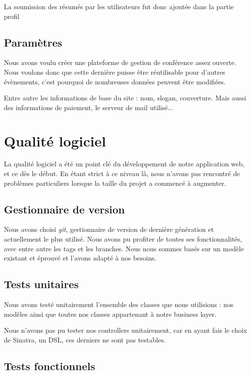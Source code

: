 \documentclass[a4paper,11pt]{article}
\begin{document}
La soumission des résumés par les utilisateurs fut donc ajoutée dans la partie profil


\subsection{Paramètres}

Nous avons voulu créer une plateforme de gestion de conférence assez ouverte. Nous voulons donc que cette dernière puisse être réutilisable pour d'autres évènements, c'est pourquoi de nombreuses données peuvent être modifiées.

Entre autre les informations de base du site : nom, slogan, couverture. Mais aussi des informations de paiement, le serveur de mail utilisé...

\section{Qualité logiciel}

La qualité logiciel a été un point clé du développement de notre application web, et ce dès le début. En étant strict à ce niveau là, nous n'avons pas rencontré de problèmes particuliers lorsque la taille du projet a commencé à augmenter.

\subsection{Gestionnaire de version}

Nous avons choisi \textit{git}, gestionnaire de version de dernière génération et actuellement le plus utilisé. Nous avons pu profiter de toutes ses fonctionnalités, avec entre autre les tags et les branches. Nous nous sommes basés sur un modèle existant et éprouvé\cite{nvie} et l'avons adapté à nos besoins.

\subsection{Tests unitaires}

Nous avons testé unitairement l'ensemble des classes que nous utilisions : nos modèles ainsi que toutes nos classes appartenant à notre business layer. 

Nous n'avons pas pu tester nos controllers unitairement, car en ayant fais le choix de Sinatra, un DSL, ces derniers ne sont pas testables.

\subsection{Tests fonctionnels}
\end{document}
